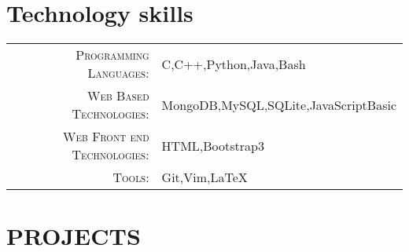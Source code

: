 \documentclass[a4paper,10pt]{article}
\begin{document}
\section{Technology skills}
\begin{tabular}{rl}
 \textsc{Programming Languages:}& C,C++,Python,Java,Bash\\
\textsc{Web Based Technologies:}& MongoDB,MySQL,SQLite,JavaScript{Basic}\\
\textsc{Web Front end Technologies:}& HTML,Bootstrap3\\
\textsc{Tools:}& Git,Vim,LaTeX\\
\end{tabular}

\section{PROJECTS}
\par
\end{document}
